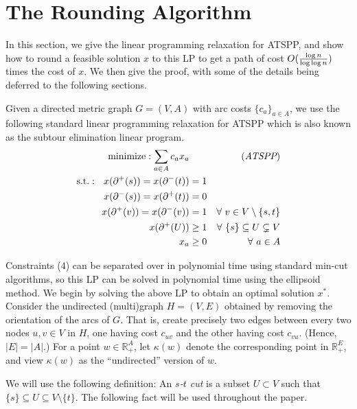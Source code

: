 \documentclass[11pt]{article}
\theoremstyle{definition}
\def\Re{{\mathbb R}}
\newcommand{\factor}{\ensuremath{O(\smash{\frac{\log n}{\log\log n}})}}
\newcounter{note}[section]
\begin{document}
\section{The Rounding Algorithm}
\label{sec:rounding-algorithm}


In this section, we give the linear programming relaxation for
ATSPP, and show how to round a feasible solution $x$ to this LP to get a path of
cost $\factor$ times the cost of $x$.
We then give the proof, with some of the details being deferred to the
following sections.

Given a directed metric graph $G = (V,A)$ with arc costs $\{c_a\}_{a \in
  A}$, we use the following standard linear programming relaxation for
ATSPP which is also known as the subtour elimination linear program.
  \begin{align}
    {\rm minimize}: \sum_{a \in A} c_a x_a & & \tag{{\em
        ATSPP}} \label{eq:lp} \\
    {\rm s.t.}:~~
     x(\partial^+(s)) = x(\partial^-(t)) & =  1 & \\
     x(\partial^-(s)) = x(\partial^+(t)) & =  0 & \\
     x(\partial^+(v)) = x(\partial^-(v)) & =  1 & \forall~ v \in V\setminus \{s,t\}\\
     x(\partial^+(U)) & \geq  1 & \forall~ \{s\} \subseteq U \subsetneq V \\
x_a & \geq  0 & \forall~ a \in A \notag
\end{align}


Constraints (4) can be separated over in polynomial time using
standard min-cut algorithms, so this LP can be solved
in polynomial time using the ellipsoid method.
We begin by solving the above LP to obtain an optimal solution $x^*$.
Consider the undirected (multi)graph $H = (V,E)$ obtained by removing
the orientation of the arcs of $G$. That is, create precisely two edges
between every two nodes $u,v \in V$ in $H$, one having cost $c_{uv}$ and
the other having cost $c_{vu}$. (Hence, $|E| = |A|$.) For a point $w \in
\Re_+^A$, let $\kappa(w)$ denote the corresponding point in $\Re_+^E$,
and view $\kappa(w)$ as the ``undirected'' version of $w$.



We will use the following definition: An \emph{$s$-$t$ cut} is a subset
$U \subset V$ such that $\{s\} \subseteq U \subseteq V\setminus
\{t\}$. The following fact will be used throughout the paper.
\end{document}
